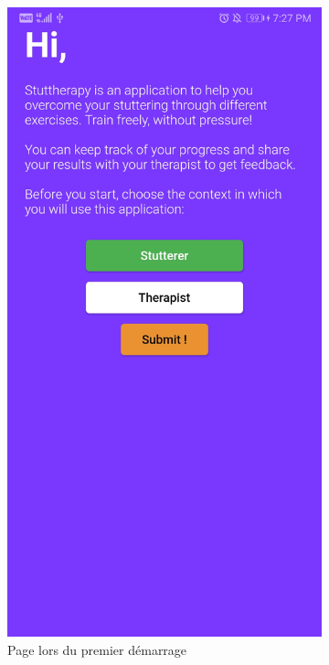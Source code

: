 \begin{appendices}
\begin{landscape}
\begin{figure}[h]
  \centering
  \begin{subfigure}{.25\textwidth}
    \centering
    \includegraphics[width=.75\linewidth]{content/imgs/screen1.jpg}
    \caption{Page lors du premier démarrage}
  \end{subfigure}%
  \begin{subfigure}{.25\textwidth}
    \centering

\end{subfigure}
\end{figure}
\end{landscape}
\end{appendices}
